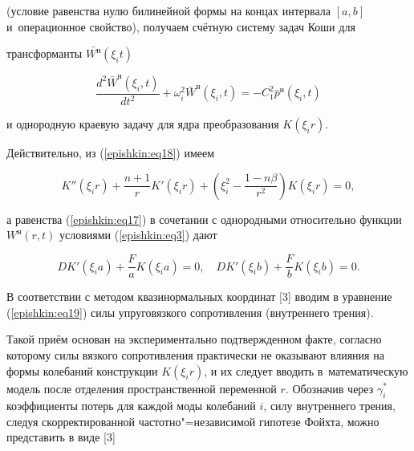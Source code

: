 (условие  равенства нулю билинейной формы на концах интервала $[a, b]$ и~операционное свойство), получаем счётную систему задач Коши для 

трансформанты $\bar  {W^{\text{н}}} (\xi _i t)$

\begin{equation}

\label{epishkin:eq19}

\frac{d^2\bar  W ^{\text{н}}(\xi _i ,t )}{dt^2}+\omega _i^2   \bar  W ^{\text{н}}(\xi _i ,t)=

-C_1^2   \bar  p ^{\text{н}}( \xi _i ,t)

\end{equation}

и однородную краевую задачу для ядра преобразования $K(\xi _i r)$. 

Действительно, из (\ref{epishkin:eq18}) имеем

\begin{equation}

\label{epishkin:eq20}

K''(\xi _i r)+\frac{n+1}{r}  K'(\xi _i r)+\left(\xi _i^2 -\frac{1-n\beta }{r^2}  \right)K(\xi _i r)=0,

\end{equation}

а равенства (\ref{epishkin:eq17}) в сочетании с однородными относительно функции $W^{\text{н}}(r,t)$ условиями (\ref{epishkin:eq3}) дают

\begin{equation}

\label{epishkin:eq21}

 D  K'(\xi _i a)+\frac{F}{a}K(\xi _i a)=0,  \quad 

 D  K'(\xi _i b)+\frac{F}{b}K(\xi _i b)=0.

\end{equation}



В соответствии с методом квазинормальных координат [3] вводим в уравнение (\ref{epishkin:eq19}) силы упруговязкого сопротивления (внутреннего трения). 

Такой приём основан на экспериментально подтвержденном факте, согласно которому силы вязкого сопротивления практически не оказывают влияния на формы колебаний конструкции $K(\xi _i r)$, и их следует вводить в~математическую модель после отделения пространственной переменной $r$. Обозначив через $\gamma_{i}^{\ast }$ коэффициенты потерь для каждой моды колебаний $i$, силу внутреннего трения, следуя скорректированной частотно"=независимой гипотезе Фойхта, можно представить в виде [3] 

